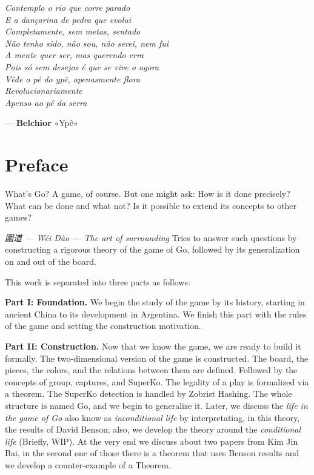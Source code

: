 \begin{center}
	\begin{minipage}{6.375cm}
		\linespread{1.3}\selectfont
		\itshape
		Contemplo o rio que corre parado \\
		E a dançarina de pedra que evolui \\
		Completamente, sem metas, sentado \\
		Não tenho sido, não sou, não serei, nem fui \\
		A mente quer ser, mas querendo erra \\
		Pois só sem desejos é que se vive o agora\\
		Vêde o pé do ypê, apenasmente flora\\
		Revolucionariamente\\
		Apenso ao pé da serra
		
		\vspace{1.5em}
		\hfill \upshape  --- \textbf{Belchior} «Ypê»
	\end{minipage}
\end{center}
\vfill %
\clearpage
\thispagestyle{empty}
\section*{Preface}
\thispagestyle{empty}
What's Go? A game, of course. But one might ask: How is it done precisely? What can be done and what not? Is it possible to extend its concepts to other games?

\textit{圍道 — Wéi Dào — The art of surrounding} Tries to answer such questions by constructing a rigorous theory of the game of Go, followed by its generalization on and out of the board.

This work is separated into three parts as follows:

\textbf{Part I: Foundation.} We begin the study of the game by its history, starting in ancient China to its development in Argentina. We finish this part with the rules of the game and setting the construction motivation.

\textbf{Part II: Construction.} Now that we know the game, we are ready to build it formally. The two-dimensional version of the game is constructed. The board, the pieces, the colors, and the relations between them are defined. Followed by the concepts of group, captures, and SuperKo. The legality of a play is formalized via a theorem. The SuperKo detection is handled by Zobrist Hashing. The whole structure is named Go, and we begin to generalize it. Later, we discuss the \textit{life in the game of Go} also know as \textit{inconditional life} by interpretating, in this theory, the results of David Benson; also, we develop the theory around the \textit{conditional life} (Briefly, WIP). At the very end we discuss about two papers from Kim Jin Bai, in the second one of those there is a theorem that uses Benson results and we develop a counter-example of a Theorem.


